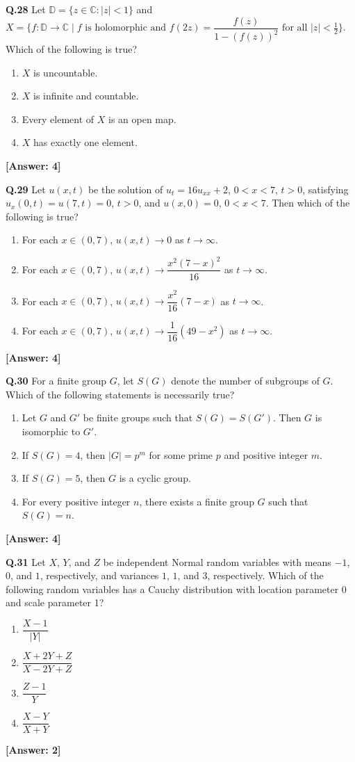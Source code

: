 \documentclass[12pt,a4paper]{article}
\newcommand{\ans}[1]{\quad\textcolor{anscolor}{\textbf{[Answer: #1]}}}
\begin{document}
\textbf{Q.28} Let $\mathbb{D}=\{z\in\mathbb{C}:|z|<1\}$ and $X=\bigl\{f:\mathbb{D}\to\mathbb{C}\mid f\text{ is holomorphic and }f(2z)=\dfrac{f(z)}{1-(f(z))^2}\text{ for all }|z|<\tfrac{1}{2}\bigr\}$. Which of the following is true?
\begin{enumerate}[label=\arabic*.]
\item $X$ is uncountable. \item $X$ is infinite and countable.
\item Every element of $X$ is an open map. \item $X$ has exactly one element.
\end{enumerate}\ans{4}

\textbf{Q.29} Let $u(x,t)$ be the solution of $u_t=16u_{xx}+2$, $0<x<7$, $t>0$, satisfying $u_x(0,t)=u(7,t)=0$, $t>0$, and $u(x,0)=0$, $0<x<7$. Then which of the following is true?
\begin{enumerate}[label=\arabic*.]
\item For each $x\in(0,7)$, $u(x,t)\to0$ as $t\to\infty$.
\item For each $x\in(0,7)$, $u(x,t)\to\dfrac{x^2(7-x)^2}{16}$ as $t\to\infty$.
\item For each $x\in(0,7)$, $u(x,t)\to\dfrac{x^2}{16}(7-x)$ as $t\to\infty$.
\item For each $x\in(0,7)$, $u(x,t)\to\dfrac{1}{16}(49-x^2)$ as $t\to\infty$.
\end{enumerate}\ans{4}

\textbf{Q.30} For a finite group $G$, let $S(G)$ denote the number of subgroups of $G$. Which of the following statements is necessarily true?
\begin{enumerate}[label=\arabic*.]
\item Let $G$ and $G'$ be finite groups such that $S(G)=S(G')$. Then $G$ is isomorphic to $G'$.
\item If $S(G)=4$, then $|G|=p^m$ for some prime $p$ and positive integer $m$.
\item If $S(G)=5$, then $G$ is a cyclic group.
\item For every positive integer $n$, there exists a finite group $G$ such that $S(G)=n$.
\end{enumerate}\ans{4}

\textbf{Q.31} Let $X$, $Y$, and $Z$ be independent Normal random variables with means $-1$, $0$, and $1$, respectively, and variances $1$, $1$, and $3$, respectively. Which of the following random variables has a Cauchy distribution with location parameter 0 and scale parameter 1?
\begin{enumerate}[label=\arabic*.]
\item $\dfrac{X-1}{|Y|}$ \item $\dfrac{X+2Y+Z}{X-2Y+Z}$ \item $\dfrac{Z-1}{Y}$ \item $\dfrac{X-Y}{X+Y}$
\end{enumerate}\ans{2}
\end{document}
